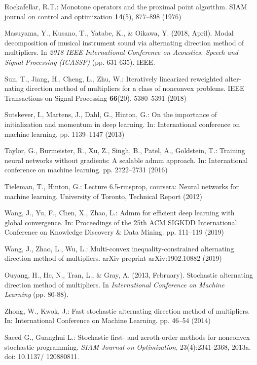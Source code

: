 \documentclass[twoside]{article}
\begin{document}
\begin{multicols}{2}
\begin{thebibliography}{99}
Rockafellar, R.T.: Monotone operators and the proximal point algorithm. SIAM
journal on control and optimization \textbf{14}(5), 877--898 (1976)

Masuyama, Y., Kusano, T., Yatabe, K., \& Oikawa, Y. (2018, April). Modal decomposition of musical instrument sound via alternating direction method of multipliers. In {\it 2018 IEEE International Conference on Acoustics, Speech and Signal Processing (ICASSP)} (pp. 631-635). IEEE.

Sun, T., Jiang, H., Cheng, L., Zhu, W.: Iteratively linearized reweighted alter-
nating direction method of multipliers for a class of nonconvex problems. IEEE Transactions on Signal Processing \textbf{66}(20), 5380--5391 (2018)

Sutskever, I., Martens, J., Dahl, G., Hinton, G.: On the importance of initialization and momentum in deep learning. In: International conference on machine learning. pp. 1139--1147 (2013)

Taylor, G., Burmeister, R., Xu, Z., Singh, B., Patel, A., Goldstein, T.: Training neural networks without gradients: A scalable admm approach. In: International conference on machine learning. pp. 2722--2731 (2016)

Tieleman, T., Hinton, G.: Lecture 6.5-rmsprop, coursera: Neural networks for machine learning. University of Toronto, Technical Report (2012)

Wang, J., Yu, F., Chen, X., Zhao, L.: Admm for efficient deep learning with global convergence. In: Proceedings of the 25th ACM SIGKDD International Conference on Knowledge Discovery \& Data Mining. pp. 111--119 (2019)

Wang, J., Zhao, L., Wu, L.: Multi-convex inequality-constrained alternating direction method of multipliers. arXiv preprint arXiv:1902.10882 (2019)

Ouyang, H., He, N., Tran, L., \& Gray, A. (2013, February). Stochastic alternating direction method of multipliers. In {\it International Conference on Machine Learning} (pp. 80-88).

Zhong, W., Kwok, J.: Fast stochastic alternating direction method of multipliers. In: International Conference on Machine Learning. pp. 46--54 (2014)

Saeed G., Guanghui L.: Stochastic first- and zeroth-order methods for nonconvex stochastic programming. \textit{SIAM Journal on Optimization}, 23(4):2341-2368, 2013a. doi: 10.1137/ 120880811.


\end{thebibliography}
\end{multicols}
\end{document}
